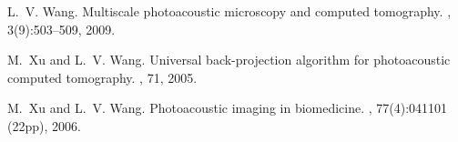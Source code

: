 \documentclass[11pt]{article}
\begin{document}
\begin{thebibliography}{10}
	L.~V. Wang.
	\newblock Multiscale photoacoustic microscopy and computed tomography.
	, 3(9):503--509, 2009.
	
	M.~Xu and L.~V. Wang.
	\newblock Universal back-projection algorithm for photoacoustic computed
	tomography.
	, 71, 2005.
	
	M.~Xu and L.~V. Wang.
	\newblock Photoacoustic imaging in biomedicine.
	, 77(4):041101 (22pp), 2006.
	
\end{thebibliography}
\end{document}
